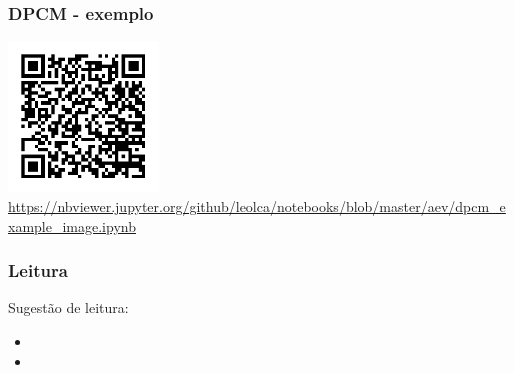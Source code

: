 \begin{frame}%
  \frametitle{DPCM - exemplo}

  \centering
  \includegraphics[width=0.3\textwidth]{images/qrcode-jupyter-dpcm.pdf}
  \url{https://nbviewer.jupyter.org/github/leolca/notebooks/blob/master/aev/dpcm_example_image.ipynb}

\end{frame}

\begin{frame}
  \frametitle{Leitura}
  Sugestão de leitura:
  \begin{itemize}
  \item {}
  \item {}
  \end{itemize}
\end{frame}
